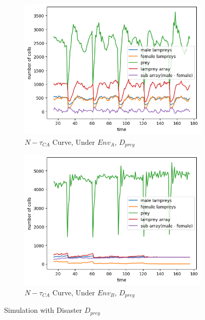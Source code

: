 \documentclass{mcmthesis}
\begin{document}
\begin{figure}[H]
  \centering
  \begin{subfigure}[b]{0.45\textwidth}
    \includegraphics[width=\textwidth]{figures/6_2_figur1.png}
    \caption{$N-\tau_{CA}$ Curve, Under $Env_{A}$, $D_{prey}$}
    \label{fig:sub1}
  \end{subfigure}
  \hfill
  \begin{subfigure}[b]{0.45\textwidth}
    \includegraphics[width=\textwidth]{figures/6_2_figur2.png}
    \caption{$N-\tau_{CA}$ Curve, Under $Env_{B}$, $D_{prey}$}
    \label{fig:sub2}
  \end{subfigure}
  
  \caption{Simulation with Disaster $D_{prey}$}
  \label{fig:Simulation of Disaster}
\end{figure}
\end{document}
